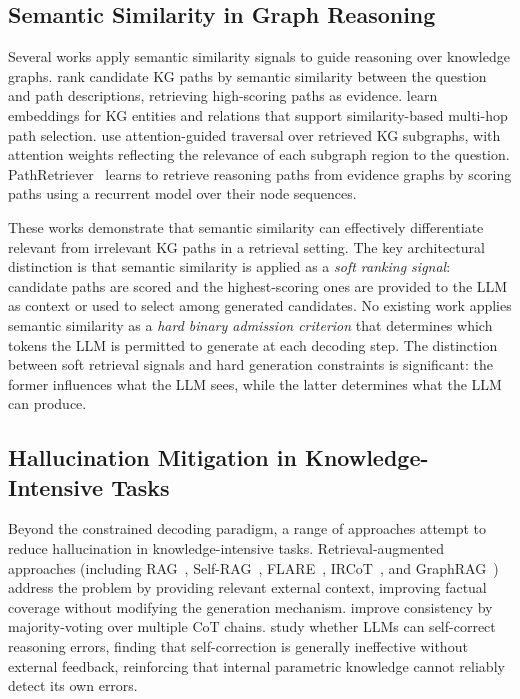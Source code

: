 \subsection{Semantic Similarity in Graph Reasoning}

Several works apply semantic similarity signals to guide reasoning over knowledge graphs. \citet{shi2021kgpath} rank candidate KG paths by semantic similarity between the question and path descriptions, retrieving high-scoring paths as evidence. \citet{saxena2022kgqa} learn embeddings for KG entities and relations that support similarity-based multi-hop path selection. \citet{he2021multihop} use attention-guided traversal over retrieved KG subgraphs, with attention weights reflecting the relevance of each subgraph region to the question. PathRetriever~\citep{asai2019learning} learns to retrieve reasoning paths from evidence graphs by scoring paths using a recurrent model over their node sequences.

These works demonstrate that semantic similarity can effectively differentiate relevant from irrelevant KG paths in a retrieval setting. The key architectural distinction is that semantic similarity is applied as a \textit{soft ranking signal}: candidate paths are scored and the highest-scoring ones are provided to the LLM as context or used to select among generated candidates. No existing work applies semantic similarity as a \textit{hard binary admission criterion} that determines which tokens the LLM is permitted to generate at each decoding step. The distinction between soft retrieval signals and hard generation constraints is significant: the former influences what the LLM sees, while the latter determines what the LLM can produce.

\subsection{Hallucination Mitigation in Knowledge-Intensive Tasks}

Beyond the constrained decoding paradigm, a range of approaches attempt to reduce hallucination in knowledge-intensive tasks. Retrieval-augmented approaches (including RAG~\citep{lewis2020rag}, Self-RAG~\citep{asai2024selfrag}, FLARE~\citep{jiang2023flare}, IRCoT~\citep{trivedi2022ircot}, and GraphRAG~\citep{edge2024graphrag}) address the problem by providing relevant external context, improving factual coverage without modifying the generation mechanism. \citet{wang2023selfconsistency} improve consistency by majority-voting over multiple CoT chains. \citet{huang2024selfcorrect} study whether LLMs can self-correct reasoning errors, finding that self-correction is generally ineffective without external feedback, reinforcing that internal parametric knowledge cannot reliably detect its own errors.

